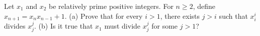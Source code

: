Let $x_1$ and $x_2$ be relatively prime positive integers. For $n \geq 2$, define $x_{n+1} = x_n x_{n-1} + 1$.
(a) Prove that for every $i > 1$, there exists $j > i$ such that $x_i^i$ divides $x_j^j$.
(b) Is it true that $x_1$ must divide $x_j^j$ for some $j > 1$?

